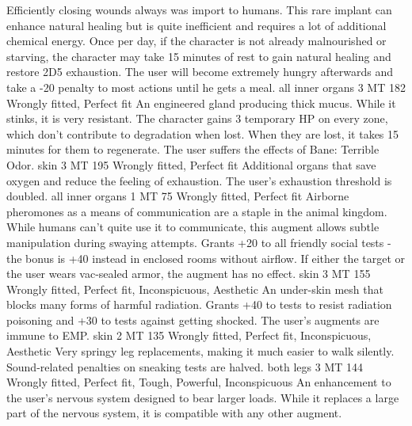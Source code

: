 \begin{multicols}{2}
    {Efficiently closing wounds always was import to humans.
        This rare implant can enhance natural healing
        but is quite inefficient and requires a lot of additional chemical energy.}
    {Once per day, if the character is not already malnourished or starving,
        the character may take 15 minutes of rest to gain natural healing and restore 2D5 exhaustion.
        The user will become extremely hungry afterwards and take a -20 penalty to most actions until he gets a meal.}
    {all inner organs}
    {3 MT}
    {182}
    {Wrongly fitted, Perfect fit}
    {An engineered gland producing thick mucus.
        While it stinks, it is very resistant.}
    {The character gains 3 temporary HP on every zone,
        which don't contribute to degradation when lost.
        When they are lost, it takes 15 minutes for them to regenerate.
        The user suffers the effects of Bane: Terrible Odor.}
    {skin}
    {3 MT}
    {195}
    {Wrongly fitted, Perfect fit}
    {Additional organs that save oxygen and reduce the feeling of exhaustion.}
    {The user's exhaustion threshold is doubled.}
    {all inner organs}
    {1 MT}
    {75}
    {Wrongly fitted, Perfect fit}
    {Airborne pheromones as a means of communication are a staple in the animal kingdom.
        While humans can't quite use it to communicate,
        this augment allows subtle manipulation during swaying attempts.}
    {Grants +20 to all friendly social tests - the bonus is +40 instead in enclosed rooms without airflow.
        If either the target or the user wears vac-sealed armor,
        the augment has no effect.}
    {skin}
    {3 MT}
    {155}
    {Wrongly fitted, Perfect fit, Inconspicuous, Aesthetic}
    {An under-skin mesh that blocks many forms of harmful radiation.}
    {Grants +40 to tests to resist radiation poisoning
        and +30 to tests against getting shocked.
        The user's augments are immune to EMP.}
    {skin}
    {2 MT}
    {135}
    {Wrongly fitted, Perfect fit, Inconspicuous, Aesthetic}
    {Very springy leg replacements, making it much easier to walk silently.}
    {Sound-related penalties on sneaking tests are halved.}
    {both legs}
    {3 MT}
    {144}
    {Wrongly fitted, Perfect fit, Tough, Powerful, Inconspicuous}
    {An enhancement to the user's nervous system designed to bear larger loads.
        While it replaces a large part of the nervous system,
        it is compatible with any other augment.}

\end{multicols}
